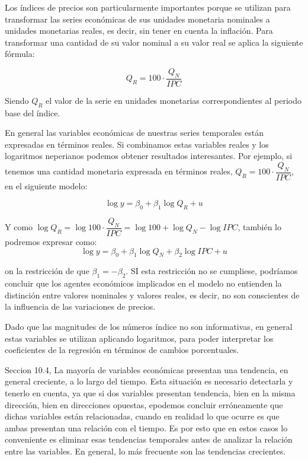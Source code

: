 Los \'indices de precios son particularmente importantes porque se utilizan para transformar las series econ\'omicas de sus unidades monetaria nominales a unidades monetarias reales, es decir, sin tener en cuenta la inflaci\'on. Para transformar una cantidad de su valor nominal a su valor real se aplica la siguiente f\'ormula:

\[Q_R=100\cdot\dfrac{Q_N}{IPC}\]

Siendo $Q_R$ el valor de la serie en unidades monetarias correspondientes al periodo base del \'indice.

En general las variables econ\'omicas de nuestras series temporales est\'an expresadas en t\'erminos reales. Si combinamos estas variables reales y los logaritmos neperianos podemos obtener resultados interesantes. Por ejemplo, si tenemos una cantidad monetaria expresada en t\'erminos reales, $Q_R=100\cdot\dfrac{Q_N}{IPC}$, en el siguiente modelo:

\[\log{y}=\beta_0+\beta_1\log{Q_R}+u\]

Y como $\log{Q_R}=\log{100\cdot\dfrac{Q_N}{IPC}}=\log{100}+\log{Q_N}-\log{IPC}$, tambi\'en lo podremos expresar como:
\[\log{y}=\beta_0+\beta_1\log{Q_N}+\beta_2\log{IPC}+u\]

on la restricci\'on de que $\beta_1=-\beta_2$. SI esta restricci\'on no se cumpliese, podr\'iamos concluir que los agentes econ\'omicos implicados en el modelo no entienden la distinci\'on entre valores nominales y valores reales, es decir, no son conscientes de la influencia de las variaciones de precios.

Dado que las magnitudes de los n\'umeros \'indice no son informativas, en general estas variables se utilizan aplicando logaritmos, para poder interpretar los coeficientes de la regresi\'on en t\'erminos de cambios porcentuales.

Seccion 10.4, 
La mayor\'ia de variables econ\'omicas presentan una tendencia, en general creciente, a lo largo del tiempo. Esta situaci\'on es necesario detectarla y tenerlo en cuenta, ya que si dos variables presentan tendencia, bien en la misma direcci\'on, bien en direcciones opuestas, epodemos concluir err\'oneamente que dichas variables est\'an relacionadas, cuando en realidad lo que ocurre es que ambas presentan una relaci\'on con el tiempo. Es por esto que en estos casos lo conveniente es eliminar esas tendencias temporales antes de analizar la relaci\'on entre las variables. En general, lo m\'as frecuente son las tendencias crecientes.

